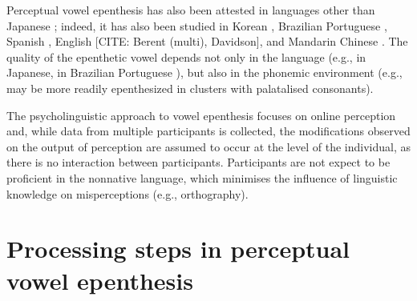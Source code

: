 Perceptual vowel epenthesis has also been attested in languages other than Japanese \cite{dupoux1999, dehaene2000, dupoux2001, monahan2009, dupoux2011, mattingley2015}; indeed, it has also been studied in Korean \cite{kabak2007, shin2011, dejong2012, durvasula2015, durvasul2016}, Brazilian Portuguese \cite{dupoux2011}, Spanish \cite{halle2014}, English [CITE: Berent (multi), Davidson], and Mandarin Chinese \cite{durvasula2018}. The quality of the epenthetic vowel depends not only in the language (e.g., \textipa{[W]} in Japanese, \textipa{[i]} in Brazilian Portuguese \cite{dupoux2011}), but also in the phonemic environment (e.g.,  may be more readily epenthesized in clusters with palatalised consonants). 

The psycholinguistic approach to vowel epenthesis focuses on online perception and, while data from multiple participants is collected, the modifications observed on the output of perception are assumed to occur at the level of the individual, as there is no interaction between participants. Participants are not expect to be proficient in the nonnative language, which minimises the influence of linguistic knowledge on misperceptions (e.g., orthography). 


\section{Processing steps in perceptual vowel epenthesis}

